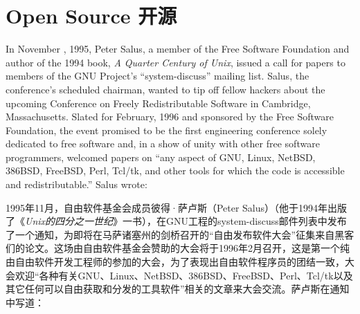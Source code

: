 
\chapter{\ifdefined\eng
Open Source
\fi
\ifdefined\chs
开源
\fi} \label{chapter:open source}



\ifdefined\eng
In November , 1995, Peter Salus, a member of the Free Software Foundation and author of the 1994 book, \textit{A Quarter Century of Unix}, issued a call for papers to members of the GNU Project's ``system-discuss'' mailing list. Salus, the conference's scheduled chairman, wanted to tip off fellow hackers about the upcoming Conference on Freely Redistributable Software in Cambridge, Massachusetts. Slated for February, 1996 and sponsored by the Free Software Foundation, the event promised to be the first engineering conference solely dedicated to free software and, in a show of unity with other free software programmers, welcomed papers on ``any aspect of GNU, Linux, NetBSD, 386BSD, FreeBSD, Perl, Tcl/tk, and other tools for which the code is accessible and redistributable.'' Salus wrote:
\fi

\ifdefined\chs
1995年11月，自由软件基金会成员彼得·萨卢斯（Peter Salus）（他于1994年出版了《\textit{Unix的四分之一世纪}》一书），在GNU工程的system-discuss邮件列表中发布了一个通知，为即将在马萨诸塞州的剑桥召开的``自由发布软件大会''征集来自黑客们的论文。这场由自由软件基金会赞助的大会将于1996年2月召开，这是第一个纯由自由软件开发工程师的参加的大会，为了表现出自由软件程序员的团结一致，大会欢迎``各种有关GNU、Linux、NetBSD、386BSD、FreeBSD、Perl、Tcl/tk以及其它任何可以自由获取和分发的工具软件''相关的文章来大会交流。萨卢斯在通知中写道：
\fi


